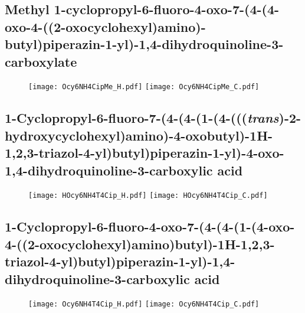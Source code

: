 \subsection{Methyl 1\hyp{}cyclopropyl\hyp{}6\hyp{}fluoro\hyp{}4\hyp{}oxo\hyp{}7\hyp{}(4\hyp{}(4\hyp{}oxo\hyp{}4\hyp{}((2\hyp{}oxocyclohexyl)amino)\hyp{}butyl)piperazin\hyp{}1\hyp{}yl)\hyp{}1,4\hyp{}dihydroquinoline\hyp{}3\hyp{}carboxylate }

\begin{figure}[H]
	\centering
		\texttt{[image: Ocy6NH4CipMe\_H.pdf]}
		\texttt{[image: Ocy6NH4CipMe\_C.pdf]}
\end{figure}

\subsection{1\hyp{}Cyclopropyl\hyp{}6\hyp{}fluoro\hyp{}7\hyp{}(4\hyp{}(4\hyp{}(1\hyp{}(4\hyp{}(((\textit{trans})\hyp{}2\hyp{}hydroxycyclohexyl)amino)\hyp{}4\hyp{}oxobutyl)\hyp{}1H\hyp{}1,2,3\hyp{}triazol\hyp{}4\hyp{}yl)butyl)piperazin\hyp{}1\hyp{}yl)\hyp{}4\hyp{}oxo\hyp{}1,4\hyp{}dihydroquinoline\hyp{}3\hyp{}carboxylic acid }

\begin{figure}[H]
	\centering
		\texttt{[image: HOcy6NH4T4Cip\_H.pdf]}
		\texttt{[image: HOcy6NH4T4Cip\_C.pdf]}
\end{figure}

\subsection{1\hyp{}Cyclopropyl\hyp{}6\hyp{}fluoro\hyp{}4\hyp{}oxo\hyp{}7\hyp{}(4\hyp{}(4\hyp{}(1\hyp{}(4\hyp{}oxo\hyp{}4\hyp{}((2\hyp{}oxocyclohexyl)amino)butyl)\hyp{}1H\hyp{}1,2,3\hyp{}triazol\hyp{}4\hyp{}yl)butyl)piperazin\hyp{}1\hyp{}yl)\hyp{}1,4\hyp{}dihydroquinoline\hyp{}3\hyp{}carboxylic acid }

\begin{figure}[H]
	\centering
		\texttt{[image: Ocy6NH4T4Cip\_H.pdf]}
		\texttt{[image: Ocy6NH4T4Cip\_C.pdf]}
\end{figure}
